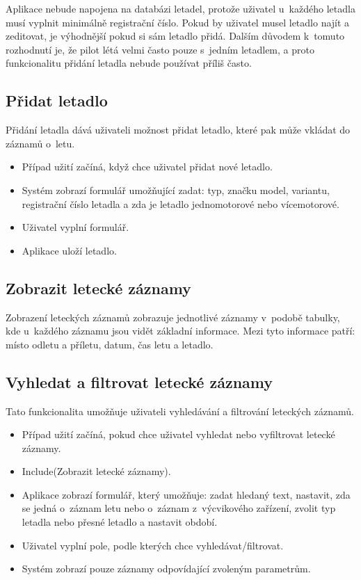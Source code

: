 \documentclass[thesis=M,czech]{FITthesis}[2012/06/26]
\begin{document}
Aplikace nebude napojena na databázi letadel, protože uživatel u~každého letadla musí vyplnit minimálně registrační číslo. Pokud by uživatel musel letadlo najít a zeditovat, je výhodnější pokud si sám letadlo přidá. Dalším důvodem k~tomuto rozhodnutí je, že pilot létá velmi často pouze s~jedním letadlem, a proto funkcionalitu přidání letadla nebude používat příliš často.

\subsection{Přidat letadlo}
Přidání letadla dává uživateli možnost přidat letadlo, které pak může vkládat do záznamů o~letu.

\begin{itemize}
\item Případ užití začíná, když chce uživatel přidat nové letadlo.
\item Systém zobrazí formulář umožňující zadat: typ, značku model, variantu, registrační číslo letadla a zda je letadlo jednomotorové nebo vícemotorové.
\item Uživatel vyplní formulář.
\item Aplikace uloží letadlo.
\end{itemize}

\subsection{Zobrazit letecké záznamy}
Zobrazení leteckých záznamů zobrazuje jednotlivé záznamy v~podobě tabulky, kde u~každého záznamu jsou vidět základní informace. Mezi tyto informace patří: místo odletu a příletu, datum, čas letu a letadlo.

\subsection{Vyhledat a filtrovat letecké záznamy}
Tato funkcionalita umožňuje uživateli vyhledávání a filtrování leteckých záznamů.

\begin{itemize}
\item Případ užití začíná, pokud chce uživatel vyhledat nebo vyfiltrovat letecké záznamy.
\item Include(Zobrazit letecké záznamy).
\item Aplikace zobrazí formulář, který umožňuje: zadat hledaný text, nastavit, zda se jedná o~záznam letu nebo o~záznam z~výcvikového zařízení, zvolit typ letadla nebo přesné letadlo a nastavit období.
\item Uživatel vyplní pole, podle kterých chce vyhledávat/filtrovat.
\item Systém zobrazí pouze záznamy odpovídající zvoleným parametrům.
\end{itemize}
\end{document}
